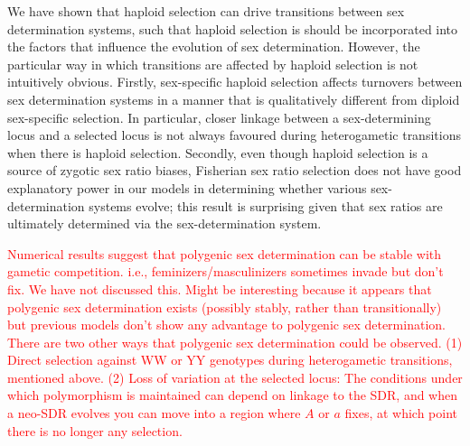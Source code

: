 \documentclass[12pt]{article}
\begin{document}
We have shown that haploid selection can drive transitions between sex determination systems, such that haploid selection is should be incorporated into the factors that influence the evolution of sex determination. 
However, the particular way in which transitions are affected by haploid selection is not intuitively obvious. 
Firstly, sex-specific haploid selection affects turnovers between sex determination systems in a manner that is qualitatively different from diploid sex-specific selection. 
In particular, closer linkage between a sex-determining locus and a selected locus is not always favoured during heterogametic transitions when there is haploid selection. 
Secondly, even though haploid selection is a source of zygotic sex ratio biases, Fisherian sex ratio selection does not have good explanatory power in our models in determining whether various sex-determination systems evolve; this result is surprising given that sex ratios are ultimately determined via the sex-determination system.

\textcolor{red}{Numerical results suggest that polygenic sex determination can be stable with gametic competition. i.e., feminizers/masculinizers sometimes invade but don't fix. We have not discussed this. Might be interesting because it appears that polygenic sex determination exists (possibly stably, rather than transitionally) but previous models don't show any advantage to polygenic sex determination. There are two other ways that polygenic sex determination could be observed. (1) Direct selection against WW or YY genotypes during heterogametic transitions, mentioned above. (2) Loss of variation at the selected locus: The conditions under which polymorphism is maintained can depend on linkage to the SDR, and when a neo-SDR evolves you can move into a region where $A$ or $a$ fixes, at which point there is no longer any selection.}

\end{document}
